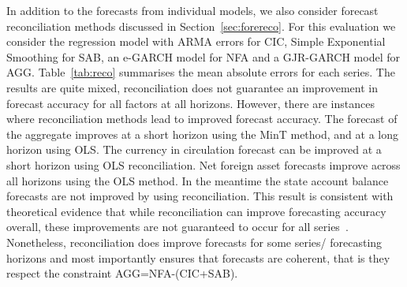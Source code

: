 \documentclass{article}
\begin{document}
In addition to the forecasts from individual models, we also consider forecast reconciliation methods discussed in Section~\ref{sec:forereco}. For this evaluation we consider the regression model with ARMA errors for CIC, Simple Exponential Smoothing for SAB, an e-GARCH model for NFA and a GJR-GARCH model for AGG. Table~\ref{tab:reco} summarises the mean absolute errors for each series. The results are quite mixed, reconciliation does not guarantee an improvement in forecast accuracy for all factors at all horizons. However, there are instances where reconciliation methods lead to improved forecast accuracy. The forecast of the aggregate improves at a short horizon using the MinT method, and at a long horizon using OLS. The currency in circulation forecast can be improved at a short horizon using OLS reconciliation. Net foreign asset forecasts improve across all horizons using the OLS method. In the meantime the state account balance forecasts are not improved by using reconciliation. This result is consistent with theoretical evidence that while reconciliation can improve forecasting accuracy overall, these improvements are not guaranteed to occur for all series~\citep{PanEtAl2021}. Nonetheless, reconciliation does improve forecasts for some series/ forecasting horizons and most importantly ensures that forecasts are coherent, that is they respect the constraint AGG=NFA-(CIC+SAB).
\end{document}
